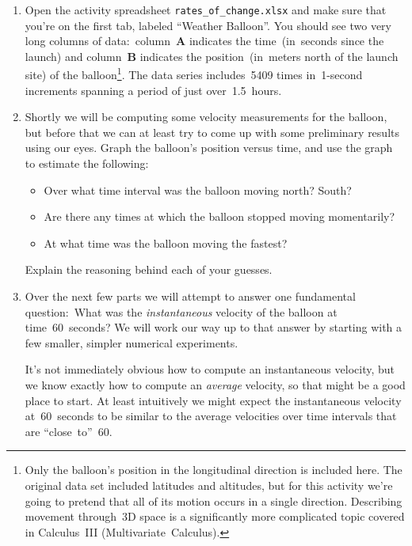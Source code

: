 \begin{enumerate}
	\item Open the activity spreadsheet \verb|rates_of_change.xlsx| and make sure that you're on the first tab, labeled ``Weather Balloon''. You should see two very long columns of data:~column~\textbf{A} indicates the time~(in~seconds since the launch) and column~\textbf{B} indicates the position~(in~meters north of the launch site) of the balloon\footnote{Only the balloon's position in the longitudinal direction is included here. The original data set included latitudes and altitudes, but for this activity we're going to pretend that all of its motion occurs in a single direction. Describing movement through~3D space is a significantly more complicated topic covered in Calculus~III (Multivariate~Calculus).}. The data series includes~5409 times in~1-second increments spanning a period of just over~1.5~hours.
	
	\item Shortly we will be computing some velocity measurements for the balloon, but before that we can at least try to come up with some preliminary results using our eyes. Graph the balloon's position versus time, and use the graph to estimate the following:
	\begin{itemize}
		\item Over what time interval was the balloon moving north? South?
		\item Are there any times at which the balloon stopped moving momentarily?
		\item At what time was the balloon moving the fastest?
	\end{itemize}
	
	Explain the reasoning behind each of your guesses.
	
	\item Over the next few parts we will attempt to answer one fundamental question:~What was the \textit{instantaneous} velocity of the balloon at time~60~seconds? We will work our way up to that answer by starting with a few smaller, simpler numerical experiments.
	
	It's not immediately obvious how to compute an instantaneous velocity, but we know exactly how to compute an \textit{average} velocity, so that might be a good place to start. At least intuitively we might expect the instantaneous velocity at~60~seconds to be similar to the average velocities over time intervals that are ``close~to''~60.
	

\end{enumerate}
